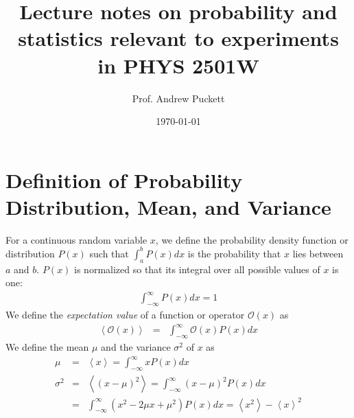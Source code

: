 \documentclass{revtex4}
\begin{document}
\title{Lecture notes on probability and statistics relevant to experiments in PHYS 2501W}
\author{Prof. Andrew Puckett}
\date{\today}
\maketitle
\section{Definition of Probability Distribution, Mean, and Variance}
For a continuous random variable $x$, we define the probability density function or distribution $P(x)$ such that $\int_a^b P(x) dx$ is the probability that $x$ lies between $a$ and $b$. $P(x)$ is normalized so that its integral over all possible values of $x$ is one:
\begin{eqnarray}
  \int_{-\infty}^{\infty} P(x) dx = 1
\end{eqnarray}
We define the \emph{expectation value} of a function or operator $\mathcal{O}(x)$ as 
\begin{eqnarray}
  \left<\mathcal{O}(x) \right> &=& \int_{-\infty}^{\infty} \mathcal{O}(x) P(x) dx
\end{eqnarray}
We define the mean $\mu$ and the variance $\sigma^2$ of $x$ as 
\begin{eqnarray}
  \mu &=& \left<x\right> = \int_{-\infty}^\infty x P(x) dx \nonumber \\
  \sigma^2 &=& \left<(x-\mu)^2\right> = \int_{-\infty}^{\infty} (x - \mu)^2 P(x) dx \nonumber \\
  &=& \int_{-\infty}^{\infty} (x^2 - 2\mu x + \mu^2) P(x) dx = \left<x^2\right> - \left<x\right>^2
\end{eqnarray}
\end{document}
